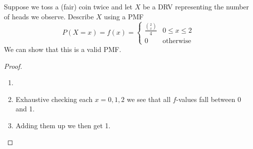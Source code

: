 \documentclass{report}
\begin{document}
\begin{example}
    Suppose we toss a (fair) coin twice and let $X$ be a DRV representing the number of heads we observe. Describe $X$ using a PMF
    \solution
    \[
        P(X=x)=f(x)=\begin{cases}
             \frac {\binom 2 x} 4 & 0\le x \le 2
            \\
            0 & \text{otherwise}
        \end{cases}
    \]
    We can show that this is a valid PMF.
    \begin{proof}
        \begin{enumerate}
            \item[]
            \item Exhaustive checking each $x=0,1,2$ we see that all $f$-values fall between 0 and 1. 
            \item Adding them up we then get 1.
        \end{enumerate}
    \end{proof}
\end{example}
\end{document}
